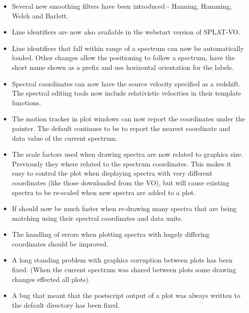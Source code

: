 \documentclass[twoside,11pt]{article}
\renewcommand{\_}{\texttt{\symbol{95}}}
\newcommand{\SPLAT}{\textsf{SPLAT-VO}}
\begin{document}
\begin{itemize}
\item Several new smoothing filters have been introduced - Hanning, Hamming,
      Welch and Barlett.

\item Line identifiers are now also available in the webstart version of \SPLAT.

\item Line identifiers that fall within range of a spectrum can now be
      automatically loaded. Other changes allow the positioning to follow
      a spectrum, have the short name shown as a prefix and use horizontal
      orientation for the labels.

\item Spectral coordinates can now have the source velocity specified
      as a redshift. The spectral editing tools now include relativistic
      velocities in their template functions.

\item The motion tracker in plot windows can now report the coordinates
      under the pointer. The default continues to be to report the nearest
      coordinate and data value of the current spectrum.

\item The scale factors used when drawing spectra are now related to
      graphics size. Previously they where related to the spectrum
      coordinates. This makes it easy to control the plot when displaying
      spectra with very different coordinates (like those downloaded from
      the VO), but will cause existing spectra to be re-scaled when new
      spectra are added to a plot.

\item If should now be much faster when re-drawing many spectra that are
      being matching using their spectral coordinates and data units.

\item The handling of errors when plotting spectra with hugely differing
      coordinates should be improved.

\item A long standing problem with graphics corruption between plots has
      been fixed. (When the current spectrum was shared between plots
      some drawing changes effected all plots).

\item A bug that meant that the postscript output of a plot was always
      written to the default directory has been fixed.


\end{itemize}
\end{document}
